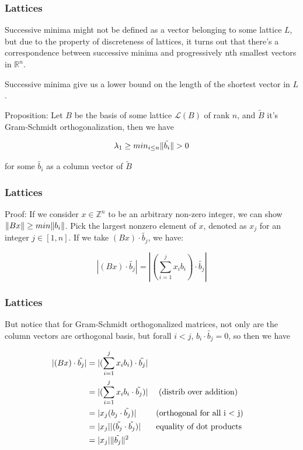 \documentclass{beamer}
\DeclarePairedDelimiter{\norm}{\lVert}{\rVert}
\newcommand{\lat}{\mathcal{L}}
\newcommand{\rat}{\mathbb{R}}
\newcommand{\zee}{\mathbb{Z}}
\begin{document}
\begin{frame}
\frametitle{Lattices}

Successive minima might not be defined as a vector belonging to some lattice $L$, but due to the property of discreteness of lattices, it turns out that there's a correspondence between successive minima and progressively nth smallest vectors in $\rat^n$.

Successive minima give us a lower bound on the length of the shortest vector in $L$.

\vspace{1em}

Proposition: Let $B$ be the basis of some lattice $\lat(B)$ of rank $n$, and $\widetilde{B}$ it's Gram-Schmidt orthogonalization, then we have

\[ \lambda_1 \geq min_{i \leq n} \norm{\tilde{b_i}} > 0 \]

for some $\tilde{b_i}$ as a column vector of $\widetilde{B}$

\end{frame}

\begin{frame}
\frametitle{Lattices}
Proof: If we consider $x \in \zee^n$ to be an arbitrary non-zero integer, we can show $\norm{Bx} \geq min \norm{b_i}$. Pick the largest nonzero element of $x$, denoted as $x_j$ for an integer $j \in [1, n]$. If we take $(Bx) \cdot \tilde{b_j}$, we have:

\[ |(Bx) \cdot \tilde{b_j}| = |(\sum_{i=1}^j x_i b_i) \cdot \tilde{b_j}| \]


\end{frame}

\begin{frame}
\frametitle{Lattices}
But notice that for Gram-Schmidt orthogonalized matrices, not only are the column vectors are orthogonal basis, but forall $i < j$, $b_i \cdot \tilde{b_j} = 0$, so then we have

\begin{align*}
|(Bx) \cdot \tilde{b_j}| &= |(\sum_{i=1}^j x_i b_i) \cdot \tilde{b_j}| \\
 &= |(\sum_{i=1}^j x_i b_i \cdot \tilde{b_j})| && \text{ (distrib over addition)} \\
 &= |x_j (b_j \cdot \tilde{b_j})| && \text{(orthogonal for all i < j)} \\
 &= |x_j||(\tilde{b_j} \cdot \tilde{b_j})| && \text{equality of dot products} \\
 &= |x_j|\norm{\tilde{b_j}}^2
\end{align*} 

\end{frame}
\end{document}
